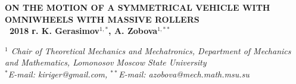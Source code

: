 




% 
\newpage
\begin{center}
\large
\textbf{ ON THE MOTION OF A SYMMETRICAL VEHICLE WITH OMNIWHEELS WITH MASSIVE ROLLERS \\
\textcopyright \ 2018 г. \quad K. Gerasimov$^{1,*}$, A. Zobova$^{1,**}$ }

\textit{ $^1$ Chair of Theoretical Mechanics and Mechatronics, Department of Mechanics and Mathematics, Lomonosov Moscow State University \\
$^*$E-mail: kiriger@gmail.com, $^{**}$E-mail: azobova@mech.math.msu.su }
\end{center}




